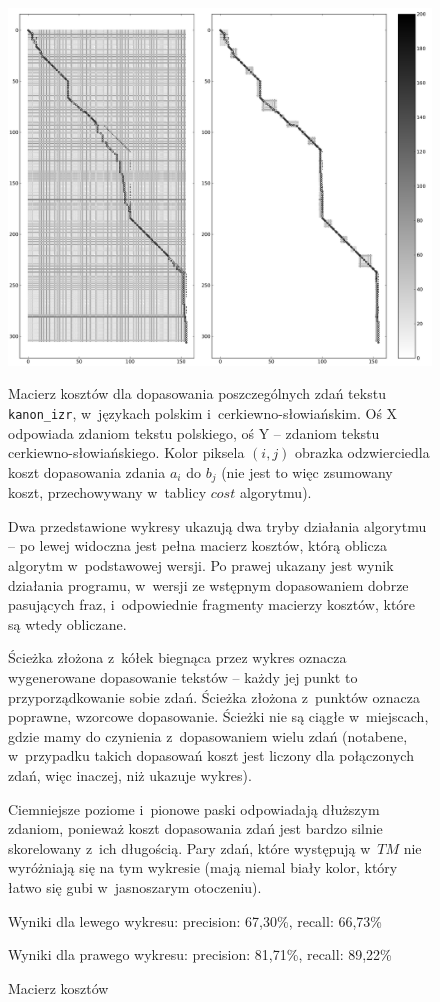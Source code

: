 \documentclass{pracamgr}
\begin{document}
\begin{figure}[p]
  \small
  \caption{Macierz kosztów}
  \includegraphics[width=\textwidth]{koszty.png}

  \setlength\parindent{20pt}

  Macierz kosztów dla dopasowania poszczególnych zdań tekstu {\tt
  kanon\_izr}, w~językach polskim i~cerkiewno-słowiańskim. Oś X
  odpowiada zdaniom tekstu polskiego, oś Y -- zdaniom tekstu
  cerkiewno-słowiańskiego. Kolor piksela $(i, j)$ obrazka odzwierciedla
  koszt dopasowania zdania $a_i$ do $b_j$ (nie jest to więc zsumowany
  koszt, przechowywany w~tablicy $cost$ algorytmu).

  Dwa przedstawione wykresy ukazują dwa tryby działania algorytmu --
  po lewej widoczna jest pełna macierz kosztów, którą oblicza algorytm
  w~podstawowej wersji. Po prawej ukazany jest wynik działania
  programu, w~wersji ze wstępnym dopasowaniem dobrze pasujących fraz,
  i~odpowiednie fragmenty macierzy kosztów, które są wtedy obliczane.

  Ścieżka złożona z~kółek biegnąca przez wykres oznacza wygenerowane
  dopasowanie tekstów -- każdy jej punkt to przyporządkowanie sobie
  zdań. Ścieżka złożona z~punktów oznacza poprawne, wzorcowe
  dopasowanie. Ścieżki nie są ciągłe w~miejscach, gdzie mamy do
  czynienia z~dopasowaniem wielu zdań (notabene, w~przypadku takich
  dopasowań koszt jest liczony dla połączonych zdań, więc inaczej, niż
  ukazuje wykres).

  Ciemniejsze poziome i~pionowe paski odpowiadają dłuższym zdaniom,
  ponieważ koszt dopasowania zdań jest bardzo silnie skorelowany z~ich
  długością. Pary zdań, które występują w~$TM$ nie wyróżniają się na
  tym wykresie (mają niemal biały kolor, który łatwo się gubi
  w~jasnoszarym otoczeniu).

  Wyniki dla lewego wykresu: precision: 67,30\%, recall: 66,73\%

  Wyniki dla prawego wykresu: precision: 81,71\%, recall: 89,22\%

  \label{fig:matrix}
\end{figure}
\end{document}
